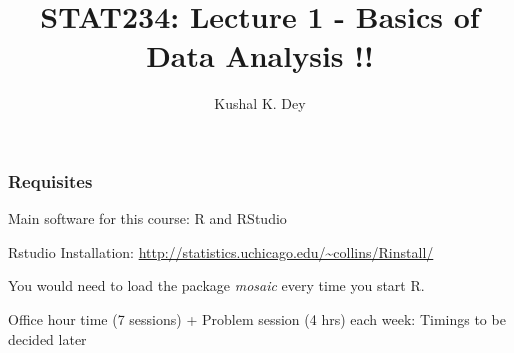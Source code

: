 \documentclass{beamer}\usepackage[]{graphicx}\usepackage[]{color}
\title{STAT234: Lecture 1 - Basics of Data Analysis !!}
\author{Kushal K. Dey}
\date{}
\begin{document}





\begin{frame}{}
\maketitle
\end{frame}

\begin{frame}[fragile]
\frametitle{Requisites}

Main software for this course: R and RStudio \pause \newline

Rstudio Installation: 
\url{http://statistics.uchicago.edu/~collins/Rinstall/} \pause \newline 

You would need to load the package \emph{mosaic} every time
you start R. \pause \newline

Office hour time (7 sessions) + Problem session (4 hrs) each week:
Timings to be decided later
\end{frame}
\end{document}
